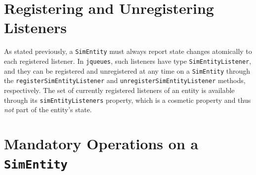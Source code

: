 \section{Registering and Unregistering Listeners}

As stated previously,
  a \lstinline|SimEntity| must always report state changes atomically
  to each registered listener.
In \lstinline|jqueues|,
  such listeners have type \lstinline|SimEntityListener|,
  and they can be registered and
  unregistered at any time on a \lstinline|SimEntity|
  through the \lstinline|registerSimEntityListener|
  and \lstinline|unregisterSimEntityListener|
  methods, respectively.
The set of currently registered listeners of an entity
  is available through its \lstinline|simEntityListeners| property,
  which is a cosmetic property and
  thus {\em not\/} part of the entity's state.
  
\section{Mandatory Operations on a \texttt{\bf SimEntity}}

